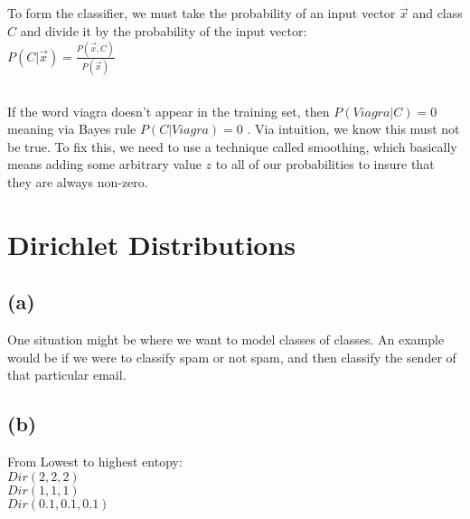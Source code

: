 \documentclass{article}
\begin{document}
\subsection{}

To form the classifier, we must take the probability of an input vector $\vec{x}$ and class $C$ and divide it by the probability of the input vector:\\

$P(C|\vec{x}) = \frac{P(\vec{x},C)}{P(\vec{x})}$

\subsection{}

If the word viagra doesn't appear in the training set, then $P(Viagra | C) = 0$ meaning via Bayes rule $P(C | Viagra) = 0$ . Via intuition, we know this must not be true. To fix this, we need to use a technique called smoothing, which basically means adding some arbitrary value $z$ to all of our probabilities to insure that they are always non-zero.

\section{Dirichlet Distributions}

\subsection{(a)}

One situation might be where we want to model classes of classes. An example would be if we were to classify spam or not spam, and then classify the sender of that particular email.

\subsection{(b)}

From Lowest to highest entopy:\\
$Dir(2,2,2)$\\
$Dir(1,1,1)$\\
$Dir(0.1,0.1,0.1)$\\
\end{document}
